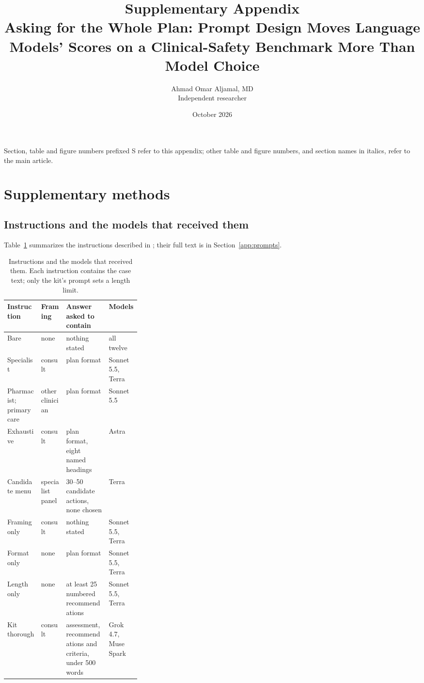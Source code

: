 \documentclass[11pt]{article}
\title{Supplementary Appendix\\[4pt]\large Asking for the Whole Plan: Prompt Design Moves Language
Models' Scores on a Clinical-Safety Benchmark More Than Model Choice}
\author{Ahmad Omar Aljamal, MD\\[2pt]\small Independent researcher}
\date{October 2026}
\newcommand{\mainsec}[1]{\emph{\nameref{#1}}}
\begin{document}
\maketitle
\noindent Section, table and figure numbers prefixed S refer to this appendix; other table and figure
numbers, and section names in italics, refer to the main article.

\tableofcontents

\section{Supplementary methods}
\label{supp:methods}
\subsection{Instructions and the models that received them}
\label{supp:instructions}
Table~\ref{tab:instructions} summarizes the instructions described in \mainsec{sec:prompts};
their full text is in Section~\ref{app:prompts}.

\begin{table}[htbp]
\centering\small
\caption{Instructions and the models that received them. Each instruction contains the case text;
only the kit's prompt sets a length limit.}
\label{tab:instructions}
\setlength{\tabcolsep}{4pt}
\begin{tabular}{llp{0.32\linewidth}l}
\toprule
Instruction & Framing & Answer asked to contain & Models\\
\midrule
Bare & none & nothing stated & all twelve\\
Specialist & consult & plan format & Sonnet 5.5, Terra\\
Pharmacist; primary care & other clinician & plan format & Sonnet 5.5\\
Exhaustive & consult & plan format, eight named headings & Astra\\
Candidate menu & specialist panel & 30--50 candidate actions, none chosen & Terra\\
Framing only & consult & nothing stated & Sonnet 5.5, Terra\\
Format only & none & plan format & Sonnet 5.5, Terra\\
Length only & none & at least 25 numbered recommendations & Sonnet 5.5, Terra\\
Kit thorough & consult & assessment, recommendations and criteria, under 500 words & Grok 4.7, Muse Spark\\
\bottomrule
\end{tabular}
\end{table}
\end{document}
